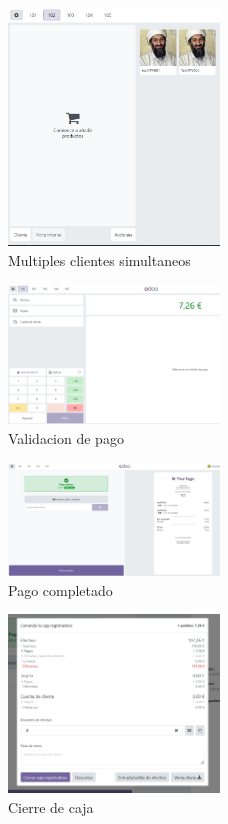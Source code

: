 \documentclass[a4paper,12pt]{article}
\begin{document}
\begin{figure}[h!]
    \centering
    \includegraphics[width=0.5\textwidth]{pr2odoo57-diferentesClientesSimultaneos.png}
    \caption{Multiples clientes simultaneos}
\end{figure}
\FloatBarrier

\begin{figure}[h!]
    \centering
    \includegraphics[width=0.5\textwidth]{pr2odoo58-validacionPago.png}
    \caption{Validacion de pago}
\end{figure}
\FloatBarrier

\begin{figure}[h!]
    \centering
    \includegraphics[width=0.5\textwidth]{pr2odoo59-pagoCompletado101.png}
    \caption{Pago completado}
\end{figure}
\FloatBarrier

\begin{figure}[h!]
    \centering
    \includegraphics[width=0.5\textwidth]{pr2odoo60-cierreCaja.png}
    \caption{Cierre de caja}
\end{figure}
\FloatBarrier
\end{document}
